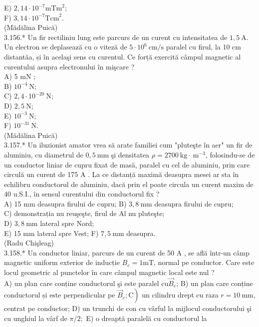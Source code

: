 \documentclass[10pt]{article}
\begin{document}
E) $2,14 \cdot 10^{-7} \mathrm{mTm}^{2}$;\\
F) $3,14 \cdot 10^{-7} \mathrm{Tcm}^{2}$.\\
(Mădălina Puică)\\
3.156.* Un fir rectiliniu lung este parcurs de un curent cu intensitatea de $1,5 \mathrm{~A}$. Un electron se deplasează cu o viteză de $5 \cdot 10^{6} \mathrm{~cm} / \mathrm{s}$ paralel cu firul, la 10 cm distantăa, și în acelaşi sens cu curentul. Ce forță exercită câmpul magnetic al curentului asupra electronului în mişcare ?\\
A) 5 mN ;\\
B) $10^{-4} \mathrm{~N}$;\\
C) $2,4 \cdot 10^{-20} \mathrm{~N}$;\\
D) $2,5 \mathrm{~N}$;\\
E) $10^{-3} \mathrm{~N}$;\\
F) $10^{-31} \mathrm{~N}$.\\
(Mădălina Puică)\\
3.157.* Un iluzionist amator vrea să arate familiei cum "pluteşte în aer" un fir de aluminiu, cu diametrul de $0,5 \mathrm{~mm}$ şi densitatea $\rho=2700 \mathrm{~kg} \cdot \mathrm{~m}^{-3}$, folosindu-se de un conductor liniar de cupru fixat de masă, paralel cu cel de aluminiu, prin care circulă un curent de 175 A . La ce distanță maximă deasupra mesei ar sta în echilibru conductorul de aluminiu, dacă prin el poate circula un curent maxim de 40 u.S.I., în sensul curentului din conductorul fix ?\\
A) 15 mm deasupra firului de cupru; B) $3,8 \mathrm{~mm}$ deasupra firului de cupru;\\
C) demonstrația nu reuşeşte, firul de Al nu pluteşte;\\
D) $3,8 \mathrm{~mm}$ lateral spre Nord;\\
E) 15 mm lateral spre Vest; F) $7,5 \mathrm{~mm}$ deasupra.\\
(Radu Chişleag)\\
3.158.* Un conductor liniar, parcurs de un curent de 50 A , se află într-un câmp magnetic uniform exterior de inducție $B_{e}=1 \mathrm{mT}$, normal pe conductor. Care este locul geometric al punctelor în care câmpul magnetic local este nul ?\\
A) un plan care conține conductorul şi este paralel $\mathrm{cu} \vec{B}_{e}$; B) un plan care conține conductorul și este perpendicular pe $\left.\vec{B}_{e} ; \mathrm{C}\right)$ un cilindru drept cu raza $r=10 \mathrm{~mm}$, centrat pe conductor; D) un trunchi de con cu vârful la mijlocul conductorului şi cu unghiul la vârf de $\pi / 2 ;$ E) o dreaptă paralelă cu conductorul la\\
\end{document}

